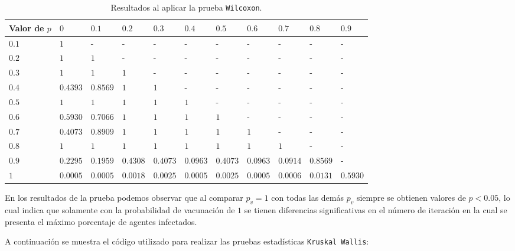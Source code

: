 \documentclass{article}
\begin{document}
\begin{table}[ht]
\centering
\caption{Resultados al aplicar la prueba \texttt{Wilcoxon}.}
\smallskip

\begin{tabular}{|p{1.7cm}|p{1cm}|p{1cm}|p{1cm}|p{1cm}|p{1cm}|p{1cm}|p{1cm}|p{1cm}|p{1cm}|p{1cm}|}
 \hline
Valor de $p$ & $0$ & $0.1$ & $0.2$ & $0.3$ & $0.4$ & $0.5$ & $0.6$ & $0.7$ & $0.8$ & $0.9$\\
 \hline
 $0.1$ & $1$ & - & - & - & - & - & - & - & - & -\\
 \hline
 $0.2$ & $1$ & $1$ & - & - & - & - & - & - & - & -\\
 \hline
 $0.3$ & $1$ & $1$ & $1$ & - & - & - & - & - & - & - \\
 \hline
 $0.4$ & $0.4393$ & $0.8569$ & $1$ & $1$ & - & - & - & - & - & - \\
 \hline
 $0.5$ & $1$ & $1$ & $1$ & $1$ & $1$ & - & - & - & - & - \\
 \hline
 $0.6$ & $0.5930$ & $0.7066$ & $1$ & $1$ & $1$ & $1$ & - & - & - & - \\
 \hline
 $0.7$ & $0.4073$ & $0.8909$ & $1$ & $1$ & $1$ & $1$ & $1$ & - & - & - \\
 \hline
 $0.8$ & $1$ & $1$ & $1$ & $1$ & $1$ & $1$ & $1$ & $1$ & - & - \\
 \hline
 $0.9$ & $0.2295$ & $0.1959$ & $0.4308$ & $0.4073$ & $0.0963$ & $0.4073$ & $0.0963$ & $0.0914$ & $0.8569$ & - \\
 \hline
 $1$ & $0.0005$ & $0.0005$ & $0.0018$ & $0.0025$ & $0.0005$ & $0.0025$ & $0.0005$ & $0.0006$ & $0.0131$ & $0.5930$ \\
 \hline
\end{tabular}
\label{Cuadro6}
\end{table}

En los resultados de la prueba podemos observar que al comparar $p_v = 1$ con todas las demás $p_v$ siempre se obtienen valores de $p < 0.05$, lo cual indica que solamente con la probabilidad de vacunación de $1$ se tienen diferencias significativas en el número de iteración en la cual se presenta el máximo porcentaje de agentes infectados. 
\bigskip

A continuación se muestra el código utilizado para realizar las pruebas estadísticas \texttt{Kruskal Wallis}:
\end{document}
